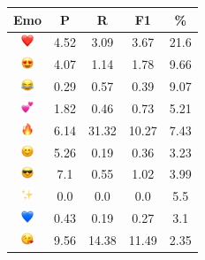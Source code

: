 \documentclass{article}
\begin{document}
\begin{table}
\centering
\begin{tabular}{|c|ccc|c|} \hline
\textbf{Emo} & \textbf{P} & \textbf{R} & \textbf{F1} & \textbf{\%} \\ \hline
\includegraphics[height=0.37cm,width=0.37cm]{img/red_heart.png} & 4.52 & 3.09 & 3.67 & 21.6\\ 
\includegraphics[height=0.37cm,width=0.37cm]{img/smiling_face_with_hearteyes.png} & 4.07 & 1.14 & 1.78 & 9.66\\ 
\includegraphics[height=0.37cm,width=0.37cm]{img/face_with_tears_of_joy.png} & 0.29 & 0.57 & 0.39 & 9.07\\ 
\includegraphics[height=0.37cm,width=0.37cm]{img/two_hearts.png} & 1.82 & 0.46 & 0.73 & 5.21\\ 
\includegraphics[height=0.37cm,width=0.37cm]{img/fire.png} & 6.14 & 31.32 & 10.27 & 7.43\\ 
\includegraphics[height=0.37cm,width=0.37cm]{img/smiling_face_with_smiling_eyes.png} & 5.26 & 0.19 & 0.36 & 3.23\\ 
\includegraphics[height=0.37cm,width=0.37cm]{img/smiling_face_with_sunglasses.png} & 7.1 & 0.55 & 1.02 & 3.99\\ 
\includegraphics[height=0.37cm,width=0.37cm]{img/sparkles.png} & 0.0 & 0.0 & 0.0 & 5.5\\ 
\includegraphics[height=0.37cm,width=0.37cm]{img/blue_heart.png} & 0.43 & 0.19 & 0.27 & 3.1\\ 
\includegraphics[height=0.37cm,width=0.37cm]{img/face_blowing_a_kiss.png} & 9.56 & 14.38 & 11.49 & 2.35\\ 

\end{tabular}
\end{table}
\end{document}

